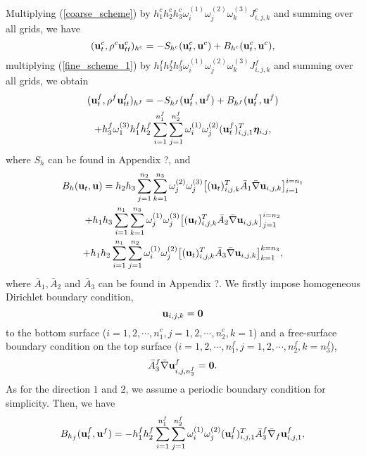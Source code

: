 \documentclass[a4paper]{article}
\begin{document}
Multiplying (\ref{coarse_scheme}) by $h_1^ch_2^ch_3^c\omega_i^{(1)}\omega_j^{(2)}\omega_k^{(3)}J_{i,j,k}^c$ and summing over all grids, we have
\begin{equation}\label{coarse_simple}
({\bf u}_t^c, \rho^c{\bf u}_{tt}^c)_{h^c} = -S_{h^c}({\bf u}_t^c,{\bf u}^c) + B_{h^c}({\bf u}_t^c,{\bf u}^c),
\end{equation}
multiplying (\ref{fine_scheme_1}) by $h_1^fh_2^fh_3^f\omega_i^{(1)}\omega_j^{(2)}\omega_k^{(3)}J_{i,j,k}^f$ and summing over all grids, we obtain
\begin{multline}\label{fine_simple}
({\bf u}_t^f, \rho^f{\bf u}_{tt}^f)_{h^f} = -S_{h^f}({\bf u}_t^f,{\bf u}^f) + B_{h^f}({\bf u}_t^f,{\bf u}^f) \\
+h_3^f\omega_1^{(3)}h_1^fh_2^f\sum_{i=1}^{n_1^f}\sum_{j=1}^{n_2^f}\omega_i^{(1)}\omega_j^{(2)}({\bf u}_t^f)_{i,j,1}^{T}{\bm \eta}_{i,j},
\end{multline}
where  $S_h$ can be found in Appendix ?, and 
\begin{multline*}
B_h({\bf u}_t, {\bf u}) = h_2h_3\sum_{j=1}^{n_2}\sum_{k=1}^{n_3}\omega_j^{(2)}\omega_j^{(3)}\big[({\bf u}_t)_{i,j,k}^{T}\bar{A}_1\bar{\nabla}{\bf u}_{i,j,k}\big]_{i=1}^{i=n_1}\\
+h_1h_3\sum_{i=1}^{n_1}\sum_{k=1}^{n_3}\omega_j^{(1)}\omega_j^{(3)}\big[({\bf u}_t)_{i,j,k}^{T}\bar{A}_2\bar{\nabla}{\bf u}_{i,j,k}\big]_{j=1}^{i=n_2}\\
+h_1h_2\sum_{i=1}^{n_1}\sum_{j=1}^{n_2}\omega_i^{(1)}\omega_j^{(2)}\big[({\bf u}_t)_{i,j,k}^{T}\bar{A}_3\bar{\nabla}{\bf u}_{i,j,k}\big]_{k=1}^{k=n_3},
\end{multline*}
where $\bar{A}_1, \bar{A}_2$ and $\bar{A}_3$ can be found in Appendix ?.  We firstly impose homogeneous Dirichlet boundary condition,
\begin{equation*}
{\bf u}_{i,j,k} = {\bf 0}
\end{equation*}
to the bottom surface ($i = 1,2,\cdots,n_1^c, j = 1,2,\cdots,n_2^c,k = 1$) and a free-surface boundary condition on the top surface ($i = 1,2,\cdots,n_1^f, j = 1,2,\cdots,n_2^f, k = n_3^f$),
\begin{equation*}
\bar{A}_3^f\bar{\nabla} {\bf u}_{i,j,n_3^f}^f = {\bf 0}.
\end{equation*}
As for the direction $1$ and $2$, we assume a periodic boundary condition for simplicity. Then, we have
\begin{equation}\label{boundary_f}
B_{h_f} ({\bf u}_t^f,{\bf u}^f) = -h_1^fh_2^f\sum_{i = 1}^{n_1^f}\sum_{j=1}^{n_2^f}\omega_i^{(1)}\omega_j^{(2)}({\bf u}_t^f)^T_{i,j,1}\bar{A}_3^f\bar{\nabla}_f{\bf u}^f_{i,j,1},
\end{equation}
\end{document}
